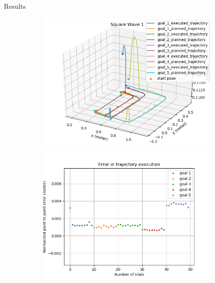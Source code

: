 \documentclass{beamer}
\begin{document}
	
	\begin{frame}{Results}
		\begin{figure}
			\begin{subfigure}[b]{0.49\linewidth}
				\includegraphics[scale=0.25]{images/2/square.png}
			\end{subfigure}
			\begin{subfigure}[b]{0.49\linewidth}
				\includegraphics[scale=0.25]{images/2/square_e.png}
			\end{subfigure}	
		\end{figure}
	\end{frame}
\end{document}
